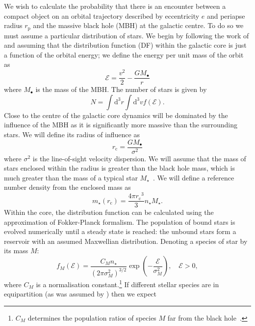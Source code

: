 \documentclass[useAMS,usedcolumn,usegraphicx,usenatbib]{mn2e}
\newcommand{\sub}[1]{\ensuremath{_\mathrm{#1}}}
\newcommand{\dd}{\ensuremath{\mathrm{d}}}
\begin{document}
We wish to calculate the probability that there is an encounter between a compact object on an orbital trajectory described by eccentricity $e$ and periapse radius $r\sub{p}$ and the massive black hole (MBH) at the galactic centre. To do so we must assume a particular distribution of stars. We begin by following the work of \citet{Bahcall1976, Bahcall1977} and assuming that the distribution function (DF) within the galactic core is just a function of the orbital energy; we define the energy per unit mass of the orbit as
\begin{equation}
\mathcal{E} = \frac{v^2}{2} - \frac{GM_\bullet}{r}
\end{equation}
where $M_\bullet$ is the mass of the MBH. The number of stars is given by
\begin{equation}
N = \int \dd^3r \int \dd^3v f(\mathcal{E}).
\end{equation}
Close to the centre of the galactic core dynamics will be dominated by the influence of the MBH as it is significantly more massive than the surrounding stars. We will define its radius of influence as~\citep{Frank1976}
\begin{equation}
r\sub{c} = \frac{GM_\bullet}{\sigma^2}
\label{eq:r_c}
\end{equation}
where $\sigma^2$ is the line-of-sight velocity dispersion. We will assume that the mass of stars enclosed within the radius is greater than the black hole mass, which is much greater than the mass of a typical star $M_\star$~\citep{Bahcall1976}. We will define a reference number density from the enclosed mass as
\begin{equation}
m_\star(r\sub{c}) = \frac{4\pi r\sub{c}^3}{3}n_\star M_\star.
\end{equation}
Within the core, the distribution function can be calculated using the approximation of Fokker-Planck formalism. The population of bound stars is evolved numerically until a steady state is reached: the unbound stars form a reservoir with an assumed Maxwellian distribution. Denoting a species of star by its mass $M$:
\begin{equation}
f_M(\mathcal{E}) = \frac{C_M n_\star}{(2\pi\sigma_M^2)^{3/2}} \exp\left(-\frac{\mathcal{E}}{\sigma_M^2}\right),\quad\mathcal{E} > 0,
\label{eq:Unbound_DF}
\end{equation}
where $C_M$ is a normalisation constant.\footnote{$C_M$ determines the population ratios of species $M$ far from the black hole~\citep{Alexander2009}.} If different stellar species are in equipartition (as was assumed by \citealt{Bahcall1976, Bahcall1977}) then we expect
\end{document}
